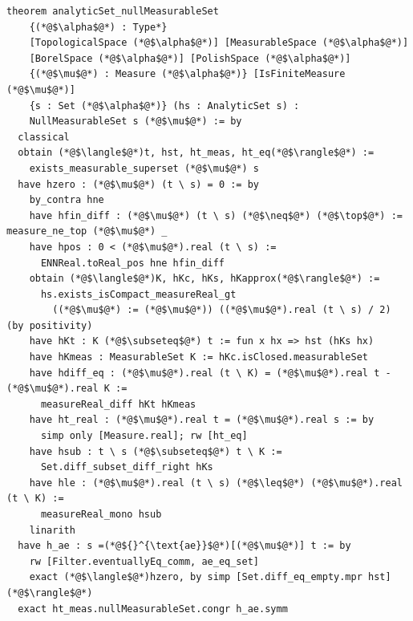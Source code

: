 \begin{lstlisting}[caption={Analytic sets are null-measurable (PureMath/AnalyticMeasurability.lean:91)}]
theorem analyticSet_nullMeasurableSet
    {(*@$\alpha$@*) : Type*}
    [TopologicalSpace (*@$\alpha$@*)] [MeasurableSpace (*@$\alpha$@*)]
    [BorelSpace (*@$\alpha$@*)] [PolishSpace (*@$\alpha$@*)]
    {(*@$\mu$@*) : Measure (*@$\alpha$@*)} [IsFiniteMeasure (*@$\mu$@*)]
    {s : Set (*@$\alpha$@*)} (hs : AnalyticSet s) :
    NullMeasurableSet s (*@$\mu$@*) := by
  classical
  obtain (*@$\langle$@*)t, hst, ht_meas, ht_eq(*@$\rangle$@*) :=
    exists_measurable_superset (*@$\mu$@*) s
  have hzero : (*@$\mu$@*) (t \ s) = 0 := by
    by_contra hne
    have hfin_diff : (*@$\mu$@*) (t \ s) (*@$\neq$@*) (*@$\top$@*) := measure_ne_top (*@$\mu$@*) _
    have hpos : 0 < (*@$\mu$@*).real (t \ s) :=
      ENNReal.toReal_pos hne hfin_diff
    obtain (*@$\langle$@*)K, hKc, hKs, hKapprox(*@$\rangle$@*) :=
      hs.exists_isCompact_measureReal_gt
        ((*@$\mu$@*) := (*@$\mu$@*)) ((*@$\mu$@*).real (t \ s) / 2) (by positivity)
    have hKt : K (*@$\subseteq$@*) t := fun x hx => hst (hKs hx)
    have hKmeas : MeasurableSet K := hKc.isClosed.measurableSet
    have hdiff_eq : (*@$\mu$@*).real (t \ K) = (*@$\mu$@*).real t - (*@$\mu$@*).real K :=
      measureReal_diff hKt hKmeas
    have ht_real : (*@$\mu$@*).real t = (*@$\mu$@*).real s := by
      simp only [Measure.real]; rw [ht_eq]
    have hsub : t \ s (*@$\subseteq$@*) t \ K :=
      Set.diff_subset_diff_right hKs
    have hle : (*@$\mu$@*).real (t \ s) (*@$\leq$@*) (*@$\mu$@*).real (t \ K) :=
      measureReal_mono hsub
    linarith
  have h_ae : s =(*@${}^{\text{ae}}$@*)[(*@$\mu$@*)] t := by
    rw [Filter.eventuallyEq_comm, ae_eq_set]
    exact (*@$\langle$@*)hzero, by simp [Set.diff_eq_empty.mpr hst](*@$\rangle$@*)
  exact ht_meas.nullMeasurableSet.congr h_ae.symm
\end{lstlisting}
